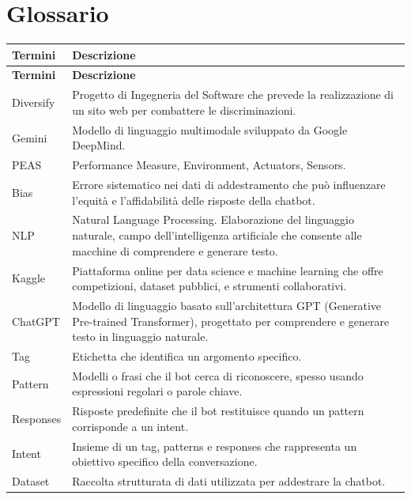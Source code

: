 \documentclass[12pt, letterpaper]{article}
\begin{document}
\section{Glossario}
\begin{longtable}{|l|p{10cm}|}
	\hline
	\textbf{Termini} & \textbf{Descrizione} \\
	\hline
	\endfirsthead
	\hline
	\textbf{Termini} & \textbf{Descrizione} \\
	\hline
	\endhead
	\hline
	\endfoot
	\hline
	\endlastfoot
	
	Diversify & Progetto di Ingegneria del Software che prevede la realizzazione di un sito web per combattere le discriminazioni. \\
	\hline
	Gemini & Modello di linguaggio multimodale sviluppato da Google DeepMind. \\
	\hline
	PEAS & Performance Measure, Environment, Actuators, Sensors. \\
	\hline
	Bias & Errore sistematico nei dati di addestramento che può influenzare l'equità e l'affidabilità delle risposte della chatbot. \\
	\hline
	NLP & Natural Language Processing. Elaborazione del linguaggio naturale, campo dell’intelligenza artificiale che consente alle macchine di comprendere e generare testo. \\
	\hline
	Kaggle & Piattaforma online per data science e machine learning che offre competizioni, dataset pubblici, e strumenti collaborativi. \\
	\hline
	ChatGPT & Modello di linguaggio basato sull'architettura GPT (Generative Pre-trained Transformer), progettato per comprendere e generare testo in linguaggio naturale. \\
	\hline
	Tag & Etichetta che identifica un argomento specifico. \\
	\hline
	Pattern & Modelli o frasi che il bot cerca di riconoscere, spesso usando espressioni regolari o parole chiave. \\
	\hline
	Responses & Risposte predefinite che il bot restituisce quando un pattern corrisponde a un intent. \\
	\hline
	Intent & Insieme di un tag, patterns e responses che rappresenta un obiettivo specifico della conversazione. \\
	\hline
	Dataset & Raccolta strutturata di dati utilizzata per addestrare la chatbot. \\

\end{longtable}
\end{document}
